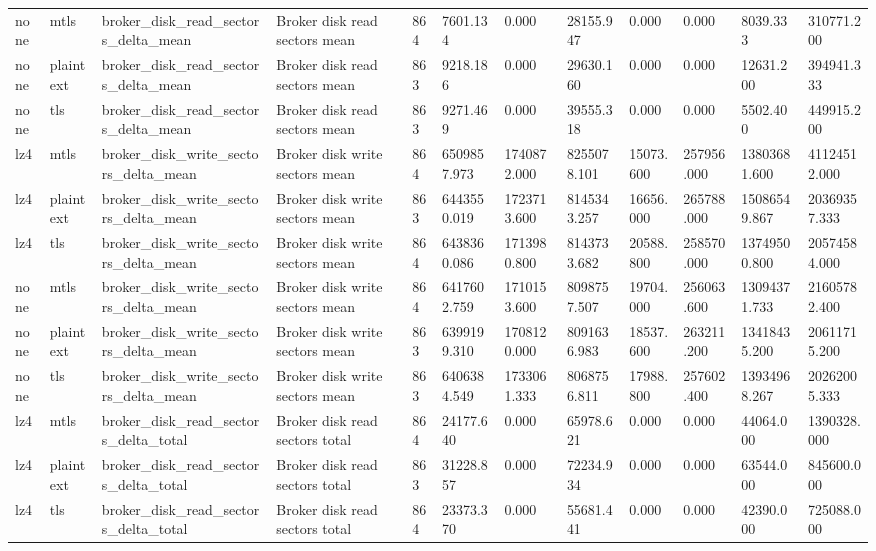 \begin{longtable}{llllllllllll}
none & mtls & broker\_disk\_read\_sectors\_delta\_mean & Broker disk read sectors mean & 864 & 7601.134 & 0.000 & 28155.947 & 0.000 & 0.000 & 8039.333 & 310771.200 \\
none & plaintext & broker\_disk\_read\_sectors\_delta\_mean & Broker disk read sectors mean & 863 & 9218.186 & 0.000 & 29630.160 & 0.000 & 0.000 & 12631.200 & 394941.333 \\
none & tls & broker\_disk\_read\_sectors\_delta\_mean & Broker disk read sectors mean & 863 & 9271.469 & 0.000 & 39555.318 & 0.000 & 0.000 & 5502.400 & 449915.200 \\
lz4 & mtls & broker\_disk\_write\_sectors\_delta\_mean & Broker disk write sectors mean & 864 & 6509857.973 & 1740872.000 & 8255078.101 & 15073.600 & 257956.000 & 13803681.600 & 41124512.000 \\
lz4 & plaintext & broker\_disk\_write\_sectors\_delta\_mean & Broker disk write sectors mean & 863 & 6443550.019 & 1723713.600 & 8145343.257 & 16656.000 & 265788.000 & 15086549.867 & 20369357.333 \\
lz4 & tls & broker\_disk\_write\_sectors\_delta\_mean & Broker disk write sectors mean & 864 & 6438360.086 & 1713980.800 & 8143733.682 & 20588.800 & 258570.000 & 13749500.800 & 20574584.000 \\
none & mtls & broker\_disk\_write\_sectors\_delta\_mean & Broker disk write sectors mean & 864 & 6417602.759 & 1710153.600 & 8098757.507 & 19704.000 & 256063.600 & 13094371.733 & 21605782.400 \\
none & plaintext & broker\_disk\_write\_sectors\_delta\_mean & Broker disk write sectors mean & 863 & 6399199.310 & 1708120.000 & 8091636.983 & 18537.600 & 263211.200 & 13418435.200 & 20611715.200 \\
none & tls & broker\_disk\_write\_sectors\_delta\_mean & Broker disk write sectors mean & 863 & 6406384.549 & 1733061.333 & 8068756.811 & 17988.800 & 257602.400 & 13934968.267 & 20262005.333 \\
lz4 & mtls & broker\_disk\_read\_sectors\_delta\_total & Broker disk read sectors total & 864 & 24177.640 & 0.000 & 65978.621 & 0.000 & 0.000 & 44064.000 & 1390328.000 \\
lz4 & plaintext & broker\_disk\_read\_sectors\_delta\_total & Broker disk read sectors total & 863 & 31228.857 & 0.000 & 72234.934 & 0.000 & 0.000 & 63544.000 & 845600.000 \\
lz4 & tls & broker\_disk\_read\_sectors\_delta\_total & Broker disk read sectors total & 864 & 23373.370 & 0.000 & 55681.441 & 0.000 & 0.000 & 42390.000 & 725088.000 \\

\end{longtable}
